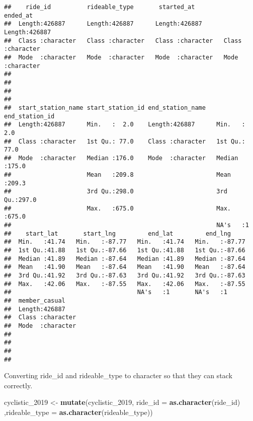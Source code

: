 \documentclass[
]{article}
\newenvironment{Shaded}{\begin{snugshade}}{\end{snugshade}}
\newcommand{\AttributeTok}[1]{\textcolor[rgb]{0.13,0.29,0.53}{#1}}
\newcommand{\FunctionTok}[1]{\textcolor[rgb]{0.13,0.29,0.53}{\textbf{#1}}}
\newcommand{\NormalTok}[1]{#1}
\newcommand{\OtherTok}[1]{\textcolor[rgb]{0.56,0.35,0.01}{#1}}
\begin{document}
\begin{verbatim}
##    ride_id          rideable_type       started_at          ended_at        
##  Length:426887      Length:426887      Length:426887      Length:426887     
##  Class :character   Class :character   Class :character   Class :character  
##  Mode  :character   Mode  :character   Mode  :character   Mode  :character  
##                                                                             
##                                                                             
##                                                                             
##                                                                             
##  start_station_name start_station_id end_station_name   end_station_id 
##  Length:426887      Min.   :  2.0    Length:426887      Min.   :  2.0  
##  Class :character   1st Qu.: 77.0    Class :character   1st Qu.: 77.0  
##  Mode  :character   Median :176.0    Mode  :character   Median :175.0  
##                     Mean   :209.8                       Mean   :209.3  
##                     3rd Qu.:298.0                       3rd Qu.:297.0  
##                     Max.   :675.0                       Max.   :675.0  
##                                                         NA's   :1      
##    start_lat       start_lng         end_lat         end_lng      
##  Min.   :41.74   Min.   :-87.77   Min.   :41.74   Min.   :-87.77  
##  1st Qu.:41.88   1st Qu.:-87.66   1st Qu.:41.88   1st Qu.:-87.66  
##  Median :41.89   Median :-87.64   Median :41.89   Median :-87.64  
##  Mean   :41.90   Mean   :-87.64   Mean   :41.90   Mean   :-87.64  
##  3rd Qu.:41.92   3rd Qu.:-87.63   3rd Qu.:41.92   3rd Qu.:-87.63  
##  Max.   :42.06   Max.   :-87.55   Max.   :42.06   Max.   :-87.55  
##                                   NA's   :1       NA's   :1       
##  member_casual     
##  Length:426887     
##  Class :character  
##  Mode  :character  
##                    
##                    
##                    
## 
\end{verbatim}

Converting ride\_id and rideable\_type to character so that they can
stack correctly.

\begin{Shaded}
\begin{Highlighting}[]
\NormalTok{cyclistic\_2019 }\OtherTok{\textless{}{-}} \FunctionTok{mutate}\NormalTok{(cyclistic\_2019, }\AttributeTok{ride\_id =} \FunctionTok{as.character}\NormalTok{(ride\_id)}
\NormalTok{                         ,}\AttributeTok{rideable\_type =} \FunctionTok{as.character}\NormalTok{(rideable\_type))}
\end{Highlighting}
\end{Shaded}
\end{document}
